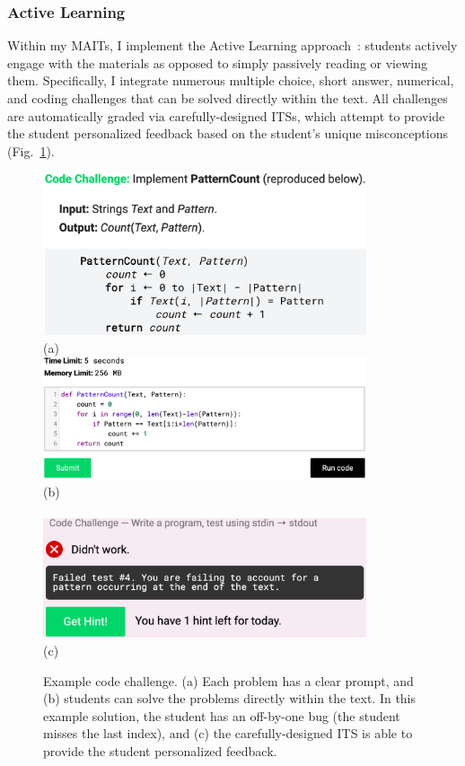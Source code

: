 \subsubsection{Active Learning}
Within my \glspl{MAIT}, I implement the Active Learning approach~\cite{Bonwell1991}: students actively engage with the materials as opposed to simply passively reading or viewing them. Specifically, I integrate numerous multiple choice, short answer, numerical, and coding challenges that can be solved directly within the text. All challenges are automatically graded via carefully-designed \glspl{ITS}, which attempt to provide the student personalized feedback based on the student's unique misconceptions (Fig.~\ref{fig:education-code-challenge}).

\begin{figure}
\centering
\includegraphics[width=0.85\textwidth]{figs/education-code-challenge-prompt}\\
(a)\\
\includegraphics[width=0.85\textwidth]{figs/education-code-challenge-bug}\\
(b)\\~\\
\includegraphics[width=0.85\textwidth]{figs/education-code-challenge-feedback}\\
(c)\\
\caption[Example Code Challenge]
{Example code challenge. (a) Each problem has a clear prompt, and (b) students can solve the problems directly within the text. In this example solution, the student has an off-by-one bug (the student misses the last index), and (c) the carefully-designed \gls{ITS} is able to provide the student personalized feedback.}
\label{fig:education-code-challenge}
\end{figure}

